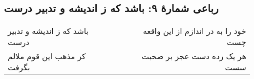 \begin{center}
\section*{رباعی شمارهٔ ۹: باشد که ز اندیشه و تدبیر درست}
\label{sec:009}
\begin{longtable}{l p{0.5cm} r}
باشد که ز اندیشه و تدبیر درست
&&
خود را به در اندازم از این واقعه چست
\\
کز مذهب این قوم ملالم بگرفت
&&
هر یک زده دست عجز بر صحبت سست
\\
\end{longtable}
\end{center}
